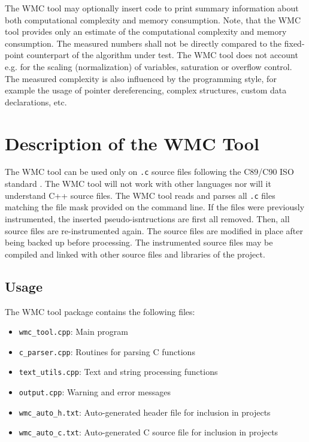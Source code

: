 The WMC tool may optionally insert code to print summary information about both computational complexity and memory consumption. Note, that the WMC tool provides only an estimate of the computational complexity and memory consumption. The measured numbers shall not be directly compared to the fixed-point counterpart of the algorithm under test. The WMC tool does not account e.g. for the scaling (normalization) of variables, saturation or overflow control. The measured complexity is also influenced by the programming style, for example the usage of pointer dereferencing, complex structures, custom data declarations, etc.

\section{Description of the WMC Tool}

The WMC tool can be used only on \verb|.c| source files following the C89/C90 ISO standard \cite{C90}. The WMC tool will not work with other languages nor will it understand C++ source files. The WMC tool reads and parses all \verb|.c| files matching the file mask provided on the command line. If the files were previously instrumented, the inserted pseudo-isntructions are first all removed. Then, all source files are re-instrumented again. The source files are modified in place  after being backed up before processing. The instrumented source files may be compiled and linked with other source files and libraries of the project. 

\subsection{Usage}
\label{ch:usage_wmc_tool}

The WMC tool package contains the following files:

\begin{itemize}
    \item \verb|wmc_tool.cpp|: Main program
    \item \verb|c_parser.cpp|: Routines for parsing C functions
    \item \verb|text_utils.cpp|: Text and string processing functions
    \item \verb|output.cpp|: Warning and error messages
    \item \verb|wmc_auto_h.txt|: Auto-generated header file for inclusion in projects
    \item \verb|wmc_auto_c.txt|: Auto-generated C source file for inclusion in projects
\end{itemize}

